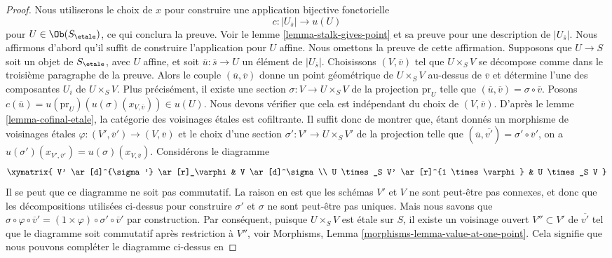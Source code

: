 \begin{proof}
\medskip\noindent
Nous utiliserons le choix de $x$ pour construire une application bijective fonctorielle
$$
c : |U_{\overline{s}}| \longrightarrow u(U)
$$
pour $U \in \Ob(S_\etale)$, ce qui conclura la preuve. Voir le
lemme \ref{lemma-stalk-gives-point}
et sa preuve pour une description de $|U_{\overline{s}}|$.
Nous affirmons d'abord qu'il suffit de construire l'application pour $U$ affine.
Nous omettons la preuve de cette affirmation.
Supposons que $U \to S$ soit un objet de $S_\etale$, avec $U$ affine, et soit
$\overline{u} : \overline{s} \to U$ un \'el\'ement de $|U_{\overline{s}}|$.
Choisissons $(V, \overline{v})$ tel que $U \times_S V$ se d\'ecompose
comme dans le troisi\`eme paragraphe de la preuve.
Alors le couple $(\overline{u}, \overline{v})$ donne un point g\'eom\'etrique de
$U \times_S V$ au-dessus de $\overline{v}$ et d\'etermine l'une des
composantes $U_i$ de $U \times_S V$. Plus pr\'ecis\'ement, il existe
une section $\sigma : V \to U \times_S V$ de la projection $\text{pr}_U$
telle que $(\overline{u}, \overline{v}) = \sigma \circ \overline{v}$. Posons
$c(\overline{u}) = u(\text{pr}_U)(u(\sigma)(x_{V, \overline{v}})) \in u(U)$.
Nous devons v\'erifier que cela est ind\'ependant du choix de $(V, \overline{v})$. D'apr\`es le
lemme \ref{lemma-cofinal-etale},
la cat\'egorie des voisinages \'etales est cofiltrante.
Il suffit donc de montrer
que, \'etant donn\'es un morphisme de voisinages \'etales
$\varphi : (V', \overline{v}') \to (V, \overline{v})$ et le choix d'une
section $\sigma' : V' \to U \times_S V'$ de la projection telle que
$(\overline{u}, \overline{v'}) = \sigma' \circ \overline{v}'$,
on a $u(\sigma')(x_{V', \overline{v}'}) = u(\sigma)(x_{V, \overline{v}})$.
Consid\'erons le diagramme
$$
\xymatrix{
V' \ar[d]^{\sigma'} \ar[r]_\varphi & V \ar[d]^\sigma \\
U \times_S V' \ar[r]^{1 \times \varphi} &
U \times_S V
}
$$
Il se peut que ce diagramme ne soit pas commutatif. La raison en est
que les sch\'emas $V'$ et $V$ ne sont peut-\^etre pas connexes, et donc que
les d\'ecompositions utilis\'ees ci-dessus pour construire $\sigma'$ et $\sigma$ ne sont
peut-\^etre pas uniques. Mais nous savons que
$\sigma \circ \varphi \circ \overline{v}' =
(1 \times \varphi) \circ \sigma' \circ \overline{v}'$
par construction. Par cons\'equent, puisque $U \times_S V$ est \'etale sur $S$,
il existe un voisinage ouvert
$V'' \subset V'$ de $\overline{v'}$ tel que le diagramme
soit commutatif apr\`es restriction \`a $V''$, voir
Morphisms, Lemma \ref{morphisms-lemma-value-at-one-point}.
Cela signifie que nous pouvons compl\'eter le diagramme ci-dessus en

\end{proof}
